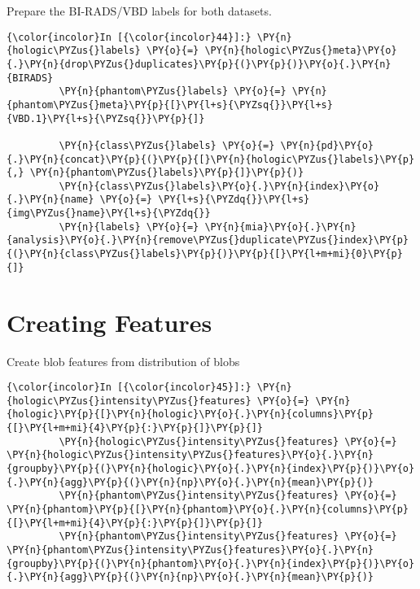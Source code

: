     Prepare the BI-RADS/VBD labels for both datasets.

    \begin{Verbatim}[commandchars=\\\{\}]
{\color{incolor}In [{\color{incolor}44}]:} \PY{n}{hologic\PYZus{}labels} \PY{o}{=} \PY{n}{hologic\PYZus{}meta}\PY{o}{.}\PY{n}{drop\PYZus{}duplicates}\PY{p}{(}\PY{p}{)}\PY{o}{.}\PY{n}{BIRADS}
         \PY{n}{phantom\PYZus{}labels} \PY{o}{=} \PY{n}{phantom\PYZus{}meta}\PY{p}{[}\PY{l+s}{\PYZsq{}}\PY{l+s}{VBD.1}\PY{l+s}{\PYZsq{}}\PY{p}{]}

         \PY{n}{class\PYZus{}labels} \PY{o}{=} \PY{n}{pd}\PY{o}{.}\PY{n}{concat}\PY{p}{(}\PY{p}{[}\PY{n}{hologic\PYZus{}labels}\PY{p}{,} \PY{n}{phantom\PYZus{}labels}\PY{p}{]}\PY{p}{)}
         \PY{n}{class\PYZus{}labels}\PY{o}{.}\PY{n}{index}\PY{o}{.}\PY{n}{name} \PY{o}{=} \PY{l+s}{\PYZdq{}}\PY{l+s}{img\PYZus{}name}\PY{l+s}{\PYZdq{}}
         \PY{n}{labels} \PY{o}{=} \PY{n}{mia}\PY{o}{.}\PY{n}{analysis}\PY{o}{.}\PY{n}{remove\PYZus{}duplicate\PYZus{}index}\PY{p}{(}\PY{n}{class\PYZus{}labels}\PY{p}{)}\PY{p}{[}\PY{l+m+mi}{0}\PY{p}{]}
\end{Verbatim}

    \section{Creating Features}\label{creating-features}

    Create blob features from distribution of blobs

    \begin{Verbatim}[commandchars=\\\{\}]
{\color{incolor}In [{\color{incolor}45}]:} \PY{n}{hologic\PYZus{}intensity\PYZus{}features} \PY{o}{=} \PY{n}{hologic}\PY{p}{[}\PY{n}{hologic}\PY{o}{.}\PY{n}{columns}\PY{p}{[}\PY{l+m+mi}{4}\PY{p}{:}\PY{p}{]}\PY{p}{]}
         \PY{n}{hologic\PYZus{}intensity\PYZus{}features} \PY{o}{=} \PY{n}{hologic\PYZus{}intensity\PYZus{}features}\PY{o}{.}\PY{n}{groupby}\PY{p}{(}\PY{n}{hologic}\PY{o}{.}\PY{n}{index}\PY{p}{)}\PY{o}{.}\PY{n}{agg}\PY{p}{(}\PY{n}{np}\PY{o}{.}\PY{n}{mean}\PY{p}{)}
         \PY{n}{phantom\PYZus{}intensity\PYZus{}features} \PY{o}{=} \PY{n}{phantom}\PY{p}{[}\PY{n}{phantom}\PY{o}{.}\PY{n}{columns}\PY{p}{[}\PY{l+m+mi}{4}\PY{p}{:}\PY{p}{]}\PY{p}{]}
         \PY{n}{phantom\PYZus{}intensity\PYZus{}features} \PY{o}{=} \PY{n}{phantom\PYZus{}intensity\PYZus{}features}\PY{o}{.}\PY{n}{groupby}\PY{p}{(}\PY{n}{phantom}\PY{o}{.}\PY{n}{index}\PY{p}{)}\PY{o}{.}\PY{n}{agg}\PY{p}{(}\PY{n}{np}\PY{o}{.}\PY{n}{mean}\PY{p}{)}
\end{Verbatim}

